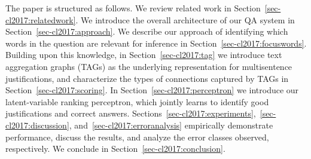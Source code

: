 The paper is structured as follows. We review related work in Section~\ref{sec-cl2017:relatedwork}. 
We introduce the overall architecture of our QA system in Section~\ref{sec-cl2017:approach}. We describe our approach of identifying which words in the question are relevant for inference in Section~\ref{sec-cl2017:focuswords}. Building upon this knowledge, in Section~\ref{sec-cl2017:tag} we introduce text aggregation graphs (TAGs) as the underlying representation for multisentence justifications, and characterize the types of connections captured by TAGs in Section~\ref{sec-cl2017:scoring}. 
 In Section~\ref{sec-cl2017:perceptron} we introduce our latent-variable ranking perceptron, which jointly learns to identify good justifications and correct answers. Sections~\ref{sec-cl2017:experiments},~\ref{sec-cl2017:discussion}, and~\ref{sec-cl2017:erroranalysis} empirically demonstrate performance, discuss the results, and analyze the error classes observed, respectively. We conclude in Section~\ref{sec-cl2017:conclusion}. 



